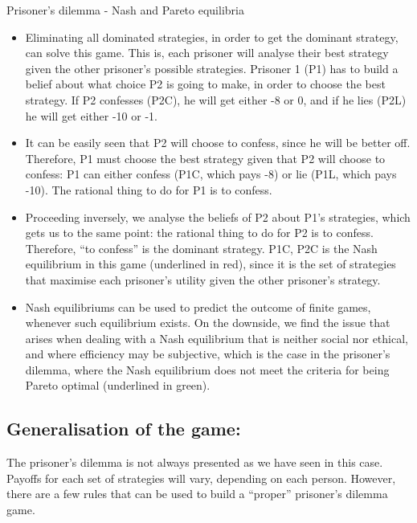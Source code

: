 \documentclass[]{report}
\begin{document}
Prisoner's dilemma - Nash and Pareto equilibria
\begin{itemize}
\item Eliminating all dominated strategies, in order to get the dominant strategy, can solve this game. This is, each prisoner will analyse their best strategy given the other prisoner’s possible strategies. Prisoner 1 (P1) has to build a belief about what choice P2 is going to make, in order to choose the best strategy. If P2 confesses (P2C), he will get either -8 or 0, and if he lies (P2L) he will get either -10 or -1. 
	
\item It can be easily seen that P2 will choose to confess, since he will be better off. Therefore, P1 must choose the best strategy given that P2 will choose to confess: P1 can either confess (P1C, which pays -8) or lie (P1L, which pays -10). The rational thing to do for P1 is to confess. 
	
\item	Proceeding inversely, we analyse the beliefs of P2 about P1’s strategies, which gets us to the same point: the rational thing to do for P2 is to confess. Therefore, “to confess” is the dominant strategy. P1C, P2C is the Nash equilibrium in this game (underlined in red), since it is the set of strategies that maximise each prisoner’s utility given the other prisoner’s strategy.
	
\item Nash equilibriums can be used to predict the outcome of finite games, whenever such equilibrium exists. On the downside, we find the issue that arises when dealing with a Nash equilibrium that is neither social nor ethical, and where efficiency may be subjective, which is the case in the prisoner’s dilemma, where the Nash equilibrium does not meet the criteria for being Pareto optimal (underlined in green).
	
\end{itemize}



\subsection{Generalisation of the game:}

The prisoner’s dilemma is not always presented as we have seen in this case. Payoffs for each set of strategies will vary, depending on each person. However, there are a few rules that can be used to build a “proper” prisoner’s dilemma game.
\end{document}

